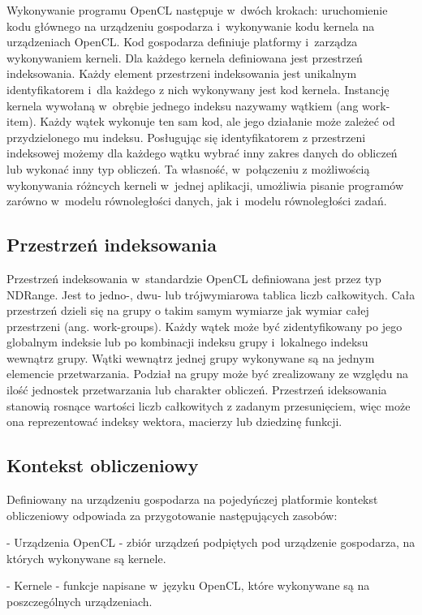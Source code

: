 Wykonywanie programu OpenCL następuje w~dwóch krokach: uruchomienie kodu głównego na urządzeniu gospodarza i~wykonywanie kodu kernela na urządzeniach OpenCL. Kod gospodarza definiuje platformy i~zarządza wykonywaniem kerneli. Dla każdego kernela definiowana jest przestrzeń indeksowania. Każdy element przestrzeni indeksowania jest unikalnym identyfikatorem i~dla każdego z nich wykonywany jest kod kernela. Instancję kernela wywołaną w~obrębie jednego indeksu nazywamy wątkiem (ang work-item). Każdy wątek wykonuje ten sam kod, ale jego działanie może zależeć od przydzielonego mu indeksu. Posługując się identyfikatorem z przestrzeni indeksowej możemy dla każdego wątku wybrać inny zakres danych do obliczeń lub wykonać inny typ obliczeń. Ta własność, w~połączeniu z możliwością wykonywania różncych kerneli w~jednej aplikacji, umożliwia pisanie programów zarówno w~modelu równoległości danych, jak i~modelu równoległości zadań.

\subsection{Przestrzeń indeksowania}\label{sec:OpenC5L}

Przestrzeń indeksowania w~standardzie OpenCL definiowana jest przez typ NDRange. Jest to jedno-, dwu- lub trójwymiarowa tablica liczb całkowitych. Cała przestrzeń dzieli się na grupy o takim samym wymiarze jak wymiar całej przestrzeni (ang. work-groups). Każdy wątek może być zidentyfikowany po jego globalnym indeksie lub po kombinacji indeksu grupy i~lokalnego indeksu wewnątrz grupy. Wątki wewnątrz jednej grupy wykonywane są na jednym elemencie przetwarzania. Podział na grupy może być zrealizowany ze względu na ilość jednostek przetwarzania lub charakter obliczeń. Przestrzeń ideksowania stanowią rosnące wartości liczb całkowitych z zadanym przesunięciem, więc może ona reprezentować indeksy wektora, macierzy lub dziedzinę funkcji.

\subsection{Kontekst obliczeniowy}\label{sec:OpenC2L}

Definiowany na urządzeniu gospodarza na pojedyńczej platformie kontekst obliczeniowy odpowiada za przygotowanie następujących zasobów:

- Urządzenia OpenCL - zbiór urządzeń podpiętych pod urządzenie gospodarza, na których wykonywane są kernele.

- Kernele - funkcje napisane w~języku OpenCL, które wykonywane są na poszczególnych urządzeniach.

